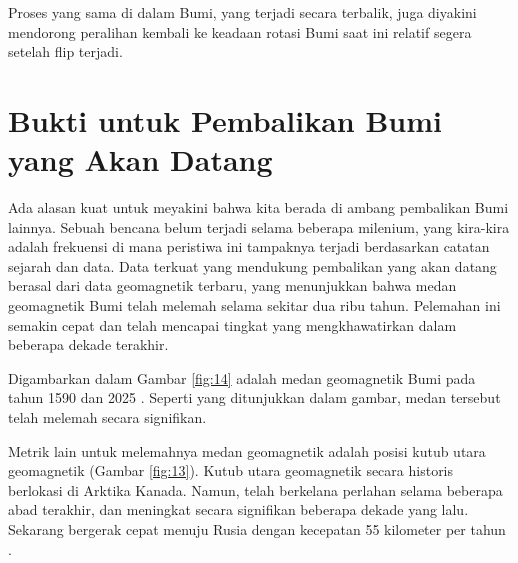\documentclass[10pt,twocolumn,letterpaper]{article}
\begin{document}
Proses yang sama di dalam Bumi, yang terjadi secara terbalik, juga diyakini mendorong peralihan kembali ke keadaan rotasi Bumi saat ini relatif segera setelah flip terjadi.

\section{Bukti untuk Pembalikan Bumi yang Akan Datang}

Ada alasan kuat untuk meyakini bahwa kita berada di ambang pembalikan Bumi lainnya. Sebuah bencana belum terjadi selama beberapa milenium, yang kira-kira adalah frekuensi di mana peristiwa ini tampaknya terjadi berdasarkan catatan sejarah dan data. Data terkuat yang mendukung pembalikan yang akan datang berasal dari data geomagnetik terbaru, yang menunjukkan bahwa medan geomagnetik Bumi telah melemah selama sekitar dua ribu tahun. Pelemahan ini semakin cepat dan telah mencapai tingkat yang mengkhawatirkan dalam beberapa dekade terakhir.

Digambarkan dalam Gambar \ref{fig:14} adalah medan geomagnetik Bumi pada tahun 1590 dan 2025 \cite{125,126}. Seperti yang ditunjukkan dalam gambar, medan tersebut telah melemah secara signifikan.

Metrik lain untuk melemahnya medan geomagnetik adalah posisi kutub utara geomagnetik (Gambar \ref{fig:13}). Kutub utara geomagnetik secara historis berlokasi di Arktika Kanada. Namun, telah berkelana perlahan selama beberapa abad terakhir, dan meningkat secara signifikan beberapa dekade yang lalu. Sekarang bergerak cepat menuju Rusia dengan kecepatan 55 kilometer per tahun \cite{124}.
\end{document}
